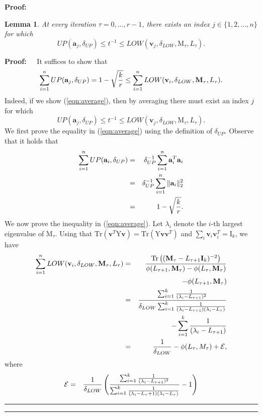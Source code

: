 \documentclass[11pt]{article}
\newcommand{\Trace }[1]{\mbox{}{\mathrm{Tr}}\left(#1\right)}
\newtheorem{lemma}[theorem]{Lemma}
\newenvironment{proof}{\begin{trivlist} \item {\bf Proof:~~}}
  {\qed\end{trivlist}}
\newcommand{\mat}[1]{{\ensuremath{\bm{\mathrm{#1}}}}}
\def\ve{{\mathbf v}}
\def\matI{\mat{I}}
\def\matM{\mat{M}}
\def\matY{\mat{Y}}
\def\frac#1#2{{#1\over #2}}
\def\qed{\hfill\rule{2mm}{2mm}}
\def\a{{\mathbf a}}
\begin{document}
\begin{proof}
\begin{lemma}\label{lem:sandwich}
At every iteration $\tau = 0, \ldots, r-1$, there exists an index $j \in \{1, 2, \ldots, n\}$
for which 
$$UP(\a_j, \delta_{UP}) \leq t^{-1} \leq LOW(\ve_j, \delta_{LOW}, \matM_{\tau}, L_{\tau}).$$
\end{lemma}
\begin{proof}
It suffices to show that
\begin{eqnarray}\label{eqn:average}
\sum_{i=1}^n UP(\a_j, \delta_{UP}) = 1 - \sqrt{\frac{k}{r}} \leq \sum_{i=1}^n LOW(\ve_i, \delta_{LOW}, \matM_{\tau}, L_{\tau}).
\end{eqnarray}
Indeed, if we show (\ref{eqn:average}), then by averaging there must exist an index $j$ for which
$$UP(\a_j, \delta_{UP}) \leq t^{-1} \leq LOW(\ve_j, \delta_{LOW}, \matM_{\tau}, L_{\tau}).$$
We first prove the equality in (\ref{eqn:average}) using the definition of $\delta_{UP}$. Observe that
it holds that 
\begin{eqnarray*}
\sum_{i=1}^n UP(\a_i, \delta_{UP}) & = & \delta_{UP}^{-1} \sum_{i=1}^n \a_i^T \a_i\\
& = & \delta_{UP}^{-1} \sum_{i=1}^n \|\a_i\|_2^2\\
& = & 1- \sqrt{\frac{k}{r}}.
\end{eqnarray*}
We now prove the inequality in (\ref{eqn:average}). Let $\lambda_i$ denote the $i$-th
largest eigenvalue of $\matM_{\tau}$. 
Using that $\Trace{\ve^T \matY \ve} = \Trace{\matY\ve\ve^T}$ and $\sum_i \ve_i \ve_i^T = \matI_{k}$,
we have
\begin{eqnarray*}
\sum_{i=1}^n LOW(\ve_i, \delta_{LOW}, \matM_{\tau}, L_{\tau}) & = &
\frac{\Trace{(\matM_{\tau} - L_{\tau + 1} \matI_{k})^{-2}}}{\phi(L_{\tau+1}, \matM_{\tau}) - \phi(L_{\tau}, \matM_{\tau})}\\
&& - \phi(L_{\tau + 1}, \matM_{\tau})\\
& = & \frac{\sum_{i=1}^k \frac{1}{(\lambda_i - L_{\tau+1})^2}}{\delta_{LOW} \sum_{i=1}^k \frac{1}{(\lambda_i - L_{\tau + 1})(\lambda_i - L_{\tau})}}\\
&& - \sum_{i=1}^k \frac{1}{(\lambda_i - L_{\tau + 1})}\\
& = & \frac{1}{\delta_{LOW}} - \phi(L_{\tau}, M_{\tau}) + \mathcal{E},
\end{eqnarray*}
where
\begin{eqnarray*}
\mathcal{E} & = & \frac{1}{\delta_{LOW}} \left (\frac{\sum_{i=1}^k \frac{1}{(\lambda_i - L_{\tau +1})^2}}{\sum_{i=1}^k \frac{1}{(\lambda_i - L_{\tau} + 1)(\lambda_i - L_{\tau})}} - 1 \right )\\

\end{eqnarray*}
\end{proof}
\end{proof}
\end{document}
